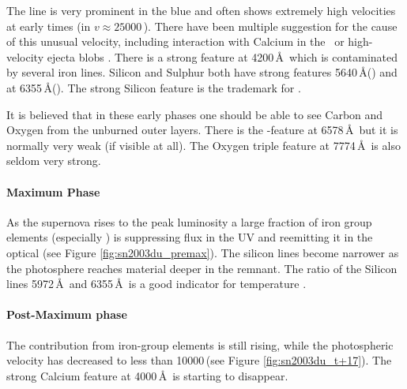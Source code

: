 The  line is very prominent in the blue and often shows extremely high velocities at early times (in  $v \approx 25000$\,\kms). There have been multiple suggestion for the cause of this unusual velocity, including interaction with Calcium in the \ism\ or high-velocity ejecta blobs \citep{1999ApJ...525..881H,2004ApJ...607..391G,2004ApJ...601.1019T,2005ApJ...623L..37M,2006ApJ...636..400Q,2006ApJ...645..470T,2007A&A...471..527G}.
There is a strong  feature at 4200\,\AA\ which is contaminated by several iron lines. Silicon and Sulphur both have strong features 5640\,\AA () and at 6355\,\AA (). The strong Silicon feature is the trademark for \sneia.

It is believed that in these early phases one should be able to see Carbon and Oxygen from the unburned outer layers. There is the -feature at 6578\,\AA\ but it is normally very weak (if visible at all). The Oxygen triple feature at 7774\,\AA\ is also seldom very strong.

\paragraph{Maximum Phase} As the supernova rises to the peak luminosity a large fraction of iron group elements (especially \Ni) is suppressing flux in the UV and reemitting it in the optical (see Figure \ref{fig:sn2003du_premax}). The silicon lines become narrower as the photosphere reaches material deeper in the remnant. The ratio of the Silicon lines  5972\,\AA\ and  6355\,\AA\ is a good indicator for temperature \citep{1995ApJ...455L.147N}. 


\paragraph{Post-Maximum phase}
The contribution from iron-group elements is still rising, while the photospheric velocity has decreased to less than 10000\,\kms (see Figure \ref{fig:sn2003du_t+17}). The strong Calcium feature at 4000\,\AA\ is starting to disappear. 

